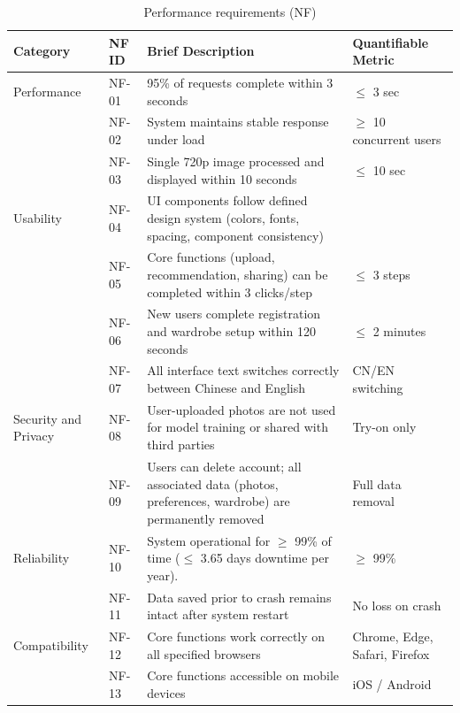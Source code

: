 \begin{table}[H]
\centering
\small
\caption{Performance requirements (NF)}
\label{tab:nfr}
\renewcommand{\arraystretch}{1.5}
\begin{tabular}{p{2.2cm}p{1.4cm}p{8.1cm}p{2.1cm}}
\toprule
\textbf{Category} & \textbf{NF ID} & \textbf{Brief Description} & \textbf{Quantifiable Metric}\\
\midrule
Performance & NF-01 & 95\% of requests complete within 3 seconds & $\leq$ 3 sec\\

 & NF-02 & System maintains stable response under load & $\geq$ 10 concurrent users \\

 & NF-03 & Single 720p image processed and displayed within 10 seconds & $\leq$ 10 sec\\

Usability & NF-04 & UI components follow defined design system (colors, fonts, spacing, component consistency) \\

 &NF-05 & Core functions (upload, recommendation, sharing) can be completed within 3 clicks/step & $\leq$ 3 steps\\

 & NF-06 & New users complete registration and wardrobe setup within 120 seconds & $\leq$ 2 minutes\\

 & NF-07 & All interface text switches correctly between Chinese and English & CN/EN switching\\

Security and Privacy & NF-08 & User-uploaded photos are not used for model training or shared with third parties &  Try-on only\\

 & NF-09 & Users can delete account; all associated data (photos, preferences, wardrobe) are permanently removed & Full data removal\\

Reliability & NF-10 & System operational for $\geq$ 99\% of time ($\leq$ 3.65 days downtime per year). & $\geq$ 99\% \\

 & NF-11 & Data saved prior to crash remains intact after system restart & No loss on crash\\

Compatibility & NF-12 & Core functions work correctly on all specified browsers & Chrome, Edge, Safari, Firefox\\

 & NF-13 & Core functions accessible on mobile devices & iOS / Android\\

\bottomrule
\end{tabular}
\end{table}

